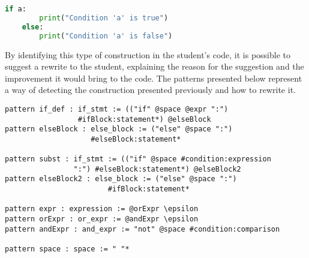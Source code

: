 \begin{lstlisting}[language=Python]
    if a:
        print("Condition 'a' is true")
    else:
        print("Condition 'a' is false")
\end{lstlisting}

By identifying this type of construction in the student's code, it is possible
to suggest a rewrite to the student, explaining the reason for the suggestion
and the improvement it would bring to the code. The patterns presented below
represent a way of detecting the construction presented previously and how to
rewrite it.




\begin{verbatim}
pattern if_def : if_stmt := (("if" @space @expr ":")
                 #ifBlock:statement*) @elseBlock
pattern elseBlock : else_block := ("else" @space ":")
                    #elseBlock:statement*

pattern subst : if_stmt := (("if" @space #condition:expression
                ":") #elseBlock:statement*) @elseBlock2
pattern elseBlock2 : else_block := ("else" @space ":")
                        #ifBlock:statement*

pattern expr : expression := @orExpr \epsilon
pattern orExpr : or_expr := @andExpr \epsilon
pattern andExpr : and_expr := "not" @space #condition:comparison

pattern space : space := " "*
\end{verbatim}

